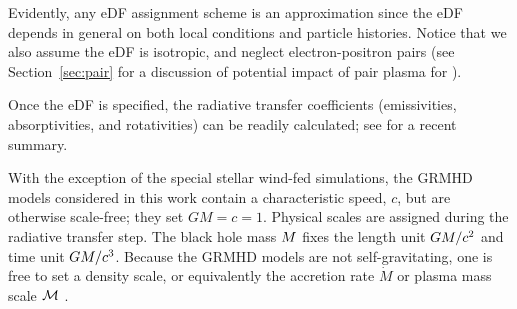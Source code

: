 Evidently, any eDF assignment scheme is an approximation since the eDF depends in general on both local conditions and particle histories.  Notice that we also assume the eDF is isotropic, and neglect electron-positron pairs (see Section~\ref{sec:pair} for a discussion of potential impact of pair plasma for \sgra).

Once the eDF is specified, the radiative transfer coefficients (emissivities, absorptivities, and rotativities) can be readily calculated; see \cite{2021ApJ...921...17M} for a recent summary.



With the exception of the special stellar wind-fed simulations, the GRMHD models considered in this work contain a characteristic speed, $c$, but are otherwise scale-free; they set $GM = c = 1$.
Physical scales are assigned during the radiative transfer step.
The black hole mass $M$ fixes the length unit $GM/c^2$ and time unit $GM/c^3$.
Because the GRMHD models are not self-gravitating, one is free to set a density scale, or equivalently the accretion rate $\dot{M}$ or plasma mass scale $\mathcal{M}$ \citep[see, e.g.,][for a full discussion]{Wong_2022}.


